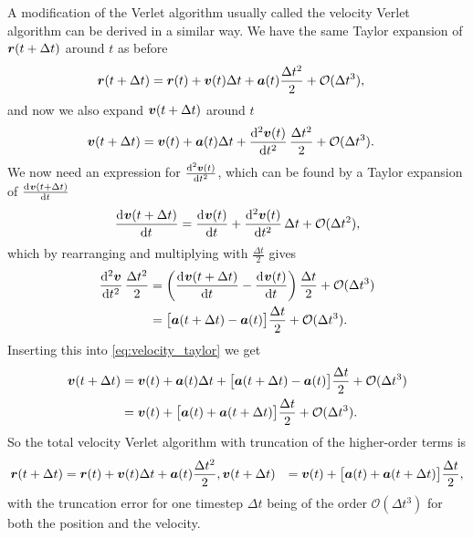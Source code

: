 A modification of the Verlet algorithm usually called the velocity Verlet algorithm\cite{swope1982computer}  can be derived in a similar way. We have the same Taylor expansion of $\boldsymbol{r}(t+\Delta t)$ around $t$ as before
\begin{align}
    \boldsymbol{r}(t + \Delta t) &= \boldsymbol{r}(t) + \boldsymbol{v}(t)\Delta t + \boldsymbol{a}(t)\frac{\Delta t^2}{2} + \mathcal{O}(\Delta t^3), \label{eq:position_taylor}
\end{align}
and now we also expand $\boldsymbol{v}(t + \Delta t)$ around $t$
\begin{align}
    \vvec(t + \Delta t) 
    &= \vvec(t) + \avec(t)\Delta t + \dod[2]{\vvec(t)}{t}\frac{\Delta t^2}{2} + \mathcal{O}(\Delta t^3). \label{eq:velocity_taylor}
\end{align}
We now need an expression for $\od[2]{\vvec(t)}{t}$, which can be found by a Taylor expansion of $\od{\vvec(t+\Delta t)}{t}$
\begin{align*}
    \dod{\vvec(t+\Delta t)}{t} = \dod{\vvec(t)}{t} + \dod[2]{\vvec(t)}{t}\Delta t + \mathcal{O}(\Delta t^2),
\end{align*}
which by rearranging and multiplying with $\frac{\Delta t}{2}$ gives
\begin{align*}
    \dod[2]{\vvec}{t}\frac{\Delta t^2}{2} 
    &= \left( \dod{\vvec(t+\Delta t)}{t} - \dod{\vvec(t)}{t}\right)\frac{\Delta t}{2} + \mathcal{O}(\Delta t^3) \\
    &= \big[\avec(t + \Delta t) - \avec(t)\big] \frac{\Delta t}{2} + \mathcal{O}(\Delta t^3).
\end{align*}
Inserting this into \cref{eq:velocity_taylor} we get
\begin{align}
    \boldsymbol{v}(t + \Delta t) 
    &= \boldsymbol{v}(t) + \boldsymbol{a}(t)\Delta t + \big[\boldsymbol{a}(t + \Delta t) - \boldsymbol{a}(t)\big] \frac{\Delta t}{2} + \mathcal{O}(\Delta t^3) \nonumber\\
    &= \boldsymbol{v}(t) + \big[\boldsymbol{a}(t) + \boldsymbol{a}(t + \Delta t)\big] \frac{\Delta t}{2} + \mathcal{O}(\Delta t^3). \label{eq:verlet_velocity_taylor_insertion}
\end{align}
So the total velocity Verlet algorithm with truncation of the higher-order terms is
\begin{align}
    \rvec(t + \Delta t) &= \rvec(t) + \vvec(t)\Delta t + \avec(t)\frac{\Delta t^2}{2}, %
    \vvec(t + \Delta t) &= \vvec(t) + \big[\avec(t) + \avec(t + \Delta t)\big] \frac{\Delta t}{2}, %
\end{align}
with the truncation error for one timestep $\Delta t$ being of the order $\mathcal{O}(\Delta t^3)$ for both the position and the velocity. 

